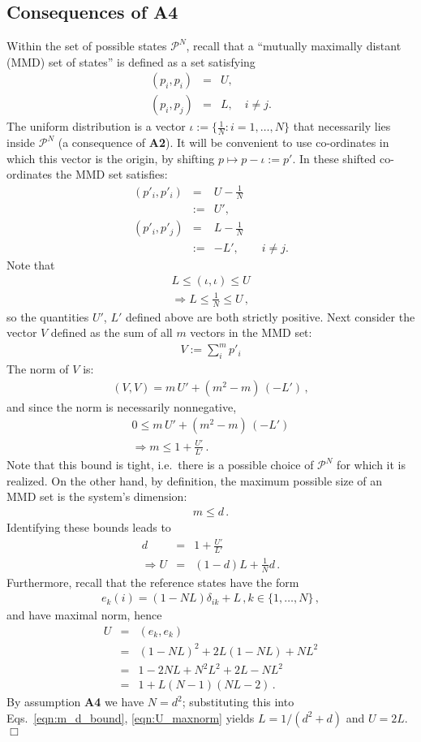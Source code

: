 \documentclass[%
 reprint,superscriptaddress,
 amsmath,amssymb,
 aps,pra, onecolumn, 12pt
]{revtex4-2}
\newcommand{\eqn}[1]{\begin{eqnarray} #1 \end{eqnarray}}
\newcommand{\zum}[2]{\displaystyle\sum_{#1}^{#2}}
\begin{document}
\begin{appendix}
\section{Consequences of {\bf A4} \label{app:vitality4}}
Within the set of possible states $\mathcal{P}^N$, recall that a ``mutually maximally distant (MMD) set of states'' is defined as a set satisfying
\eqn{
(p_i, p_i) &=& U, \nonumber \\
(p_i, p_j) &=& L,  \quad  i \neq j.
}
The uniform distribution is a vector $\iota := \{\frac{1}{N} : i=1,\dots,N \}$ that necessarily lies inside $\mathcal{P}^N$ (a consequence of {\bf A2}). It will be convenient to use co-ordinates in which this vector is the origin, by shifting $p \mapsto p-\iota := p'$. In these shifted co-ordinates the MMD set satisfies:
\eqn{
(p'_i, p'_i) &=& U-\frac{1}{N} \nonumber \\
&:=& U', \nonumber \\
(p'_i, p'_j) &=& L-\frac{1}{N} \nonumber \\
&:=& -L',  \qquad  i \neq j.
}
Note that
\eqn{
L \leq (\iota,\iota) \leq U \nonumber \\
\Rightarrow L \leq \frac{1}{N} \leq U \, ,
}
so the quantities $U'$, $L'$ defined above are both strictly positive. Next consider the vector $V$ defined as the sum of all $m$ vectors in the MMD set:
\eqn{
V := \zum{i}{m} p'_i
}
The norm of $V$ is:
\eqn{ \label{eqn:normV}
(V,V) = m\, U'+(m^2-m)\, (-L') \, ,
}
and since the norm is necessarily nonnegative,
\eqn{ \label{eqn:mmd_ineq}
0 \leq m\, U'+(m^2-m)\, (-L') \nonumber \\
\Rightarrow m \leq 1+\frac{U'}{L'} \, .
}
Note that this bound is tight, i.e.\ there is a possible choice of $\mathcal{P}^N$ for which it is realized. On the other hand, by definition, the maximum possible size of an MMD set is the system's dimension:
\eqn{ \label{eqn:mmd_ineq_d}
m \leq d \, .
}
Identifying these bounds leads to
\eqn{ \label{eqn:m_d_bound}
d &=& 1+\frac{U'}{L'} \, \nonumber \\
\Rightarrow U &=& (1-d)L+\frac{1}{N}d \, .
}
Furthermore, recall that the reference states have the form
\eqn{
e_k(i) = (1-NL)\delta_{ik} + L \, , k \in \{1,\dots, N\} \, ,
}
and have maximal norm, hence
\eqn{ \label{eqn:U_maxnorm}
U &=& (e_k, e_k) \nonumber \\
&=& (1-NL)^2 + 2L(1-NL) +NL^2 \nonumber \\
&=& 1-2NL+N^2L^2+2L-NL^2 \nonumber \\
&=& 1+L(N-1)(NL-2) \, .
}
By assumption {\bf A4} we have $N=d^2$; substituting this into Eqs.\ \eqref{eqn:m_d_bound}, \eqref{eqn:U_maxnorm} yields $L = 1/(d^2+d)$ and $U = 2L$. $\Box$


\end{appendix}
\end{document}
